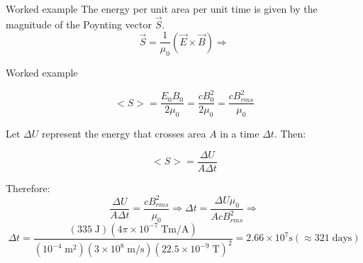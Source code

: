 {\begin{frame}{Worked example}
The energy per unit area per unit time is given by the magnitude of the
Poynting vector $\vec{S}$.
\begin{equation*}
  \vec{S} = \frac{1}{\mu_0} (\vec{E} \times \vec{B}) \Rightarrow
\end{equation*}

\end{frame}

%
%
%
%

\begin{frame}{Worked example}

\begin{equation*}
  <S> = \frac{E_0 B_0}{2\mu_0} = \frac{c B_0^2}{2\mu_0} = \frac{c B_{rms}^2}{\mu_0}
\end{equation*}

Let $\Delta U$ represent the energy that crosses
area $A$ in a time $\Delta t$. Then:

\begin{equation*}
  <S> = \frac{\Delta U}{A \Delta t}
\end{equation*}

Therefore:
\begin{equation*}
  \frac{\Delta U}{A \Delta t} = \frac{c B_{rms}^2}{\mu_0} \Rightarrow
  \Delta t = \frac{\Delta U \mu_0}{A c B_{rms}^2} \Rightarrow
\end{equation*}
\begin{equation*}
  \Delta t =
  \frac
  {
    (335 \; \text{J})
    (4\pi \times 10^{-7} \; \text{Tm/A})
  }
  {
    (10^{-4} \; \text{m}^2)
    (3 \times 10^{8} \; \text{m/s})
    (22.5 \times 10^{-9} \; \text{T})^2
  } =
  2.66 \times 10^7 \text{s} ( \approx 321 \; \text{days})
\end{equation*}

\end{frame}

} %


%
%

